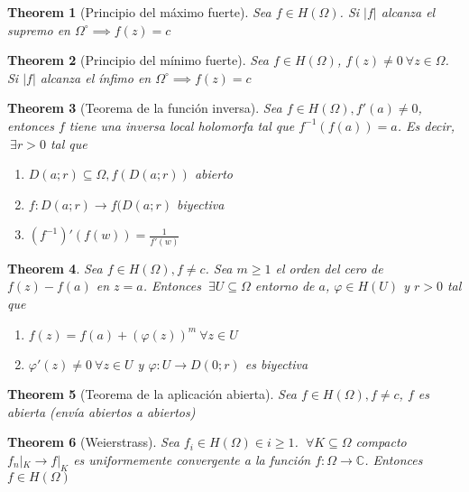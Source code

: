 \documentclass[leqno]{article}
\newtheorem*{theorem}{Theorem}
\begin{document}
\begin{theorem}[Principio del máximo fuerte]
Sea $f\in H(\Omega)$. Si $|f|$ alcanza el supremo en $\Omega^{\circ} \implies f(z) = c$
\end{theorem}

\begin{theorem}[Principio del mínimo fuerte]
Sea $f\in H(\Omega)$, $f(z)\neq 0 \ \forall z\in \Omega$. Si $|f|$ alcanza el ínfimo en  $\Omega^\circ \implies f(z) = c$
\end{theorem}

\begin{theorem}[Teorema de la función inversa] Sea $f\in H(\Omega), f'(a)\neq 0$, entonces $f$ tiene una inversa local holomorfa tal que  $f^{-1}(f(a))=a$. Es decir, $\ \exists r>0$ tal que
  \begin{enumerate}[topsep=-6pt, itemsep=0pt]
    \item $D(a;r) \subseteq  \Omega, f(D(a;r))$ abierto
	\item $f: D(a;r) \to f(D(a;r)$ biyectiva
	\item $(f^{-1})'(f(w))=\frac{1}{f'(w)}$
  \end{enumerate}
\end{theorem}

\begin{theorem} Sea $f\in H(\Omega), f\neq c$. Sea $m\ge 1$ el orden del cero de $f(z)-f(a)$ en  $z = a$. Entonces  $\ \exists U\subseteq \Omega$ entorno de $a$, $\varphi \in H(U)$ y $r>0$ tal que
   \begin{enumerate}[topsep=-6pt, itemsep=0pt]
    \item $f(z) = f(a) + (\varphi (z))^m \ \forall z\in U$
	\item $\varphi '(z) \neq 0 \ \forall z\in U$ y $\varphi : U \to D(0;r)$ es biyectiva
  \end{enumerate}
\end{theorem}

\begin{theorem}[Teorema de la aplicación abierta]
Sea $f\in H(\Omega), f\neq c$,  $f$ es abierta (envía abiertos a abiertos)
\end{theorem}

\begin{theorem}[Weierstrass]
Sea $f_i \in H(\Omega) \in i\ge 1$. $\ \forall K\subseteq \Omega$ compacto $f_n|_K \to f|_K$ es uniformemente convergente a la función $f:\Omega \to \mathbb{C}$. Entonces $f\in H(\Omega)$
\end{theorem}
\end{document}
